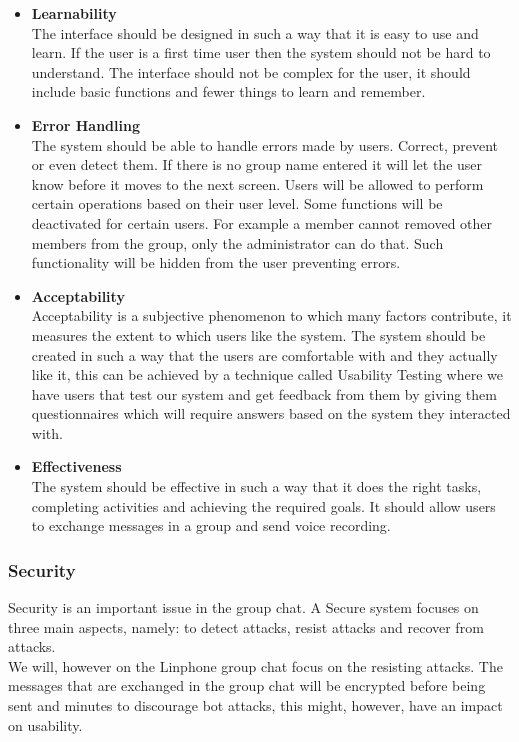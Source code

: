 \documentclass[a4paper]{article}
\begin{document}
\begin{itemize}
\item \textbf{Learnability} \\
The interface should be designed in such a way that it is easy to use and learn. If the user is a first time user then the system should not be hard to understand. 
The interface should not be complex for the user, it should include basic functions and fewer things to learn and remember.

\item \textbf{Error Handling} \\
The system should be able to handle errors made by users. Correct, prevent or even detect them. If there is no group name entered it will let the user know before it moves to the next screen.
Users will be allowed to perform certain operations based on their user level. Some functions will be deactivated for certain users. 
For example a member cannot removed other members from the group, only the administrator can do that. Such functionality will be hidden from the user preventing errors. 

\item \textbf{Acceptability} \\
Acceptability is a subjective phenomenon to which many factors contribute, it measures the extent to which users like the system. 
The system should be created in such a way that the users are comfortable with and they actually like it, this can be achieved by a technique called Usability Testing where we have users that test our system and get feedback from them by giving them questionnaires which will require answers based on the system they interacted with.


\item \textbf{Effectiveness} \\
The system should be effective in such a way that it does the right tasks, completing activities and achieving the required goals. It should allow users to exchange messages in a group and send voice recording.
\end{itemize}

\subsubsection{Security}
Security is an important issue in the group chat. A Secure system focuses on three main aspects, namely: to detect attacks, resist attacks and recover from attacks.\\
We will, however on the Linphone group chat focus on the resisting attacks. The messages that are exchanged in the group chat will be encrypted before being sent and minutes to discourage bot attacks, this might, however, have an impact on usability.\\
\end{document}

